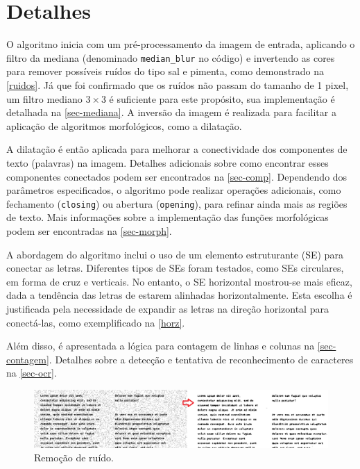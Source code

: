 \documentclass[english, 
               brazil, 
               bsc] %
               {dcomp-abntex2}
\begin{document}






\section{Detalhes} 




O algoritmo inicia com um pré-processamento da imagem de entrada, aplicando o filtro da mediana (denominado \texttt{median\_blur} no código) e invertendo as cores para remover possíveis ruídos do tipo sal e pimenta, como demonstrado na \autoref{ruidos}. Já que foi confirmado que os ruídos não passam do tamanho de 1 pixel, um filtro mediano $3 \times 3$ é suficiente para este propósito, sua implementação é detalhada na \autoref{sec-mediana}. A inversão da imagem é realizada para facilitar a aplicação de algoritmos morfológicos, como a dilatação.


A dilatação é então aplicada para melhorar a conectividade dos componentes de texto (palavras) na imagem. Detalhes adicionais sobre como encontrar esses componentes conectados podem ser encontrados na \autoref{sec-comp}. Dependendo dos parâmetros especificados, o algoritmo pode realizar operações adicionais, como fechamento (\texttt{closing}) ou abertura (\texttt{opening}), para refinar ainda mais as regiões de texto. Mais informações sobre a implementação das funções morfológicas podem ser encontradas na \autoref{sec-morph}.


A abordagem do algoritmo inclui o uso de um elemento estruturante (SE) para conectar as letras. Diferentes tipos de SEs foram testados, como SEs circulares, em forma de cruz e verticais. No entanto, o SE horizontal mostrou-se mais eficaz, dada a tendência das letras de estarem alinhadas horizontalmente. Esta escolha é justificada pela necessidade de expandir as letras na direção horizontal para conectá-las, como exemplificado na \autoref{horz}.


Além disso, é apresentada a lógica para contagem de linhas e colunas na \autoref{sec-contagem}. Detalhes sobre a detecção e tentativa de reconhecimento de caracteres na \autoref{sec-ocr}.


\begin{figure}[htb]
        \caption{\label{ruidos} \small  Remoção de ruído. }
        \begin{center}
            \includegraphics[scale=0.43]{./images/noise.png}
        \end{center}
\end{figure}
\end{document}
